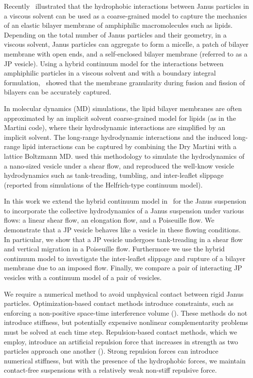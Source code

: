 \documentclass[lineno]{jfm}
\begin{document}
Recently~\cite{Fu20}
illustrated that the hydrophobic interactions between Janus particles in
a viscous solvent can be used as a coarse-grained model to capture the
mechanics of an elastic bilayer membrane of amphiphilic macromolecules
such as lipids. Depending on the total number of Janus particles and
their geometry, in a viscous solvent, Janus particles can aggregate to
form a micelle, a patch of bilayer membrane with open ends, and a
self-enclosed bilayer membrane (referred to as a JP vesicle). Using a
hybrid continuum model for the interactions between amphiphilic
particles in a viscous solvent and with a boundary integral
formulation,~\cite{Fu20} showed that the membrane granularity during
fusion and fission of bilayers can be accurately captured. 

In molecular dynamics (MD) simulations, the lipid bilayer membranes are
often approximated by an implicit solvent coarse-grained model for
lipids (as in the Martini code), where their hydrodynamic interactions
are simplified by an implicit solvent. The long-range hydrodynamic
interactions and the induced long-range lipid interactions can be
captured by combining the Dry Martini with a lattice Boltzmann MD.
\cite{Brandner2019} used this methodology to simulate the hydrodynamics
of a nano-sized vesicle under a shear flow, and reproduced the well-know
vesicle hydrodynamics such as tank-treading, tumbling, and inter-leaflet
slippage (reported from simulations of the Helfrich-type continuum
model).

In this work we extend the hybrid continuum model in~\cite{Fu20} for the
Janus suspension to incorporate the collective hydrodynamics of a Janus
suspension under various flows: a linear shear flow, an elongation flow,
and a Poiseuille flow. We demonstrate that a JP vesicle behaves like
a vesicle in these flowing conditions. In particular, we show that a
JP vesicle undergoes tank-treading in a shear flow and vertical
migration in a Poiseuille flow. Furthermore we use the hybrid continuum
model to investigate the inter-leaflet slippage and rupture of a bilayer
membrane due to an imposed flow. Finally, we compare a pair of
interacting JP vesicles with a continuum model of a pair of vesicles.

We require a numerical method to avoid unphysical contact between rigid
Janus particles. Optimization-based contact methods introduce
constraints, such as enforcing a non-positive space-time interference
volume (\cite{lu-rah-zor2017, Lukas19, yan-cor-mal-vee-she2020}). These
methods do not introduce stiffness, but potentially expensive nonlinear
complementarity problems must be solved at each time step.
Repulsion-based contact methods, which we employ, introduce an
artificial repulsion force that increases in strength as two particles
approach one another (\cite{glo-pan-hes-jos-per2001, fen-mic2004,
kab-qua-bir2018}). Strong repulsion forces can introduce numerical
stiffness, but with the presence of the hydrophobic forces, we maintain
contact-free suspensions with a relatively weak non-stiff repulsive
force.
\end{document}
